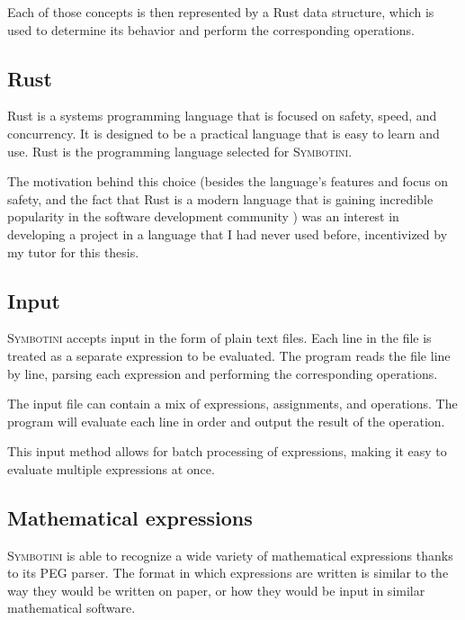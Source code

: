 Each of those concepts is then represented by a Rust data structure, which is used to determine its behavior and perform the corresponding operations.

\subsection{Rust}\label{subsec:rust}

Rust \parencite{matsakis2014rust} is a systems programming language that is focused on safety, speed, and concurrency. It is designed to be a practical language that is easy to learn and use. Rust is the programming language selected for \textsc{Symbotini}.

The motivation behind this choice (besides the language's features and focus on safety, and the fact that Rust is a modern language that is gaining incredible popularity in the software development community \parencite{stack-overflow-survey}) was an interest in developing a project in a language that I had never used before, incentivized by my tutor for this thesis.

\subsection{Input}\label{subsec:input}

\textsc{Symbotini} accepts input in the form of plain text files. Each line in the file is treated as a separate expression to be evaluated. The program reads the file line by line, parsing each expression and performing the corresponding operations.

The input file can contain a mix of expressions, assignments, and operations. The program will evaluate each line in order and output the result of the operation.

This input method allows for batch processing of expressions, making it easy to evaluate multiple expressions at once.

\subsection{Mathematical expressions}\label{subsec:mathematical-expressions}

\textsc{Symbotini} is able to recognize a wide variety of mathematical expressions thanks to its PEG parser. The format in which expressions are written is similar to the way they would be written on paper, or how they would be input in similar mathematical software.

